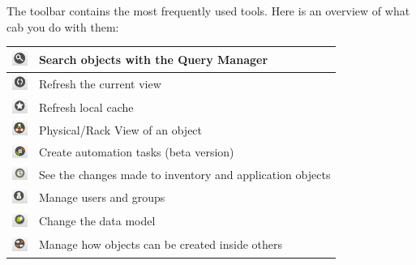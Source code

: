 \documentclass[a4paper]{article}
\begin{document}
	The toolbar contains the most frequently used tools. Here is an overview of what cab you do with them:
	\begin{table}[h!]
		\centering
		\begin{tabular}{cl}
			\includegraphics[width=0.5cm]{img/icon_query_manager.png} & Search objects with the Query Manager\\
			\midrule
			\includegraphics[width=0.5cm]{img/icon_refresh_component.png} & Refresh the current view\\
			\midrule
			\includegraphics[width=0.5cm]{img/icon_refresh_cache.png} & Refresh local cache\\
			\midrule
			\includegraphics[width=0.5cm]{img/icon_object_view.png} & Physical/Rack View of an object\\
			\midrule
			\includegraphics[width=0.5cm]{img/icon_task_manager.png} & Create automation tasks (beta version)\\
			\midrule
			\includegraphics[width=0.5cm]{img/icon_audit_trail.png} & See the changes made to inventory and application objects\\
			\midrule
			\includegraphics[width=0.5cm]{img/icon_user_manager.png} & Manage users and groups\\
			\midrule
			\includegraphics[width=0.5cm]{img/icon_data_model_manager.png} & Change the data model\\
			\midrule
			\includegraphics[width=0.5cm]{img/icon_containment_manager.png} & Manage how objects can be created inside others\\

\end{tabular}
\end{table}
\end{document}

